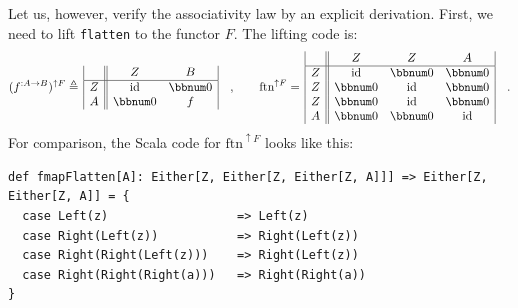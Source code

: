 Let us, however, verify the associativity law by an explicit derivation.
First, we need to lift \lstinline!flatten! to the functor $F$. The
lifting code is:
\[
(f^{:A\rightarrow B})^{\uparrow F}\triangleq\,\begin{array}{|c||cc|}
 & Z & B\\
\hline Z & \text{id} & \bbnum 0\\
A & \bbnum 0 & f
\end{array}\quad,\quad\quad\text{ftn}^{\uparrow F}=\,\begin{array}{|c||ccc|}
 & Z & Z & A\\
\hline Z & \text{id} & \bbnum 0 & \bbnum 0\\
Z & \bbnum 0 & \text{id} & \bbnum 0\\
Z & \bbnum 0 & \text{id} & \bbnum 0\\
A & \bbnum 0 & \bbnum 0 & \text{id}
\end{array}\quad.
\]
For comparison, the Scala code for $\text{ftn}^{\uparrow F}$ looks
like this:
\begin{lstlisting}
def fmapFlatten[A]: Either[Z, Either[Z, Either[Z, A]]] => Either[Z, Either[Z, A]] = {
  case Left(z)                  => Left(z)
  case Right(Left(z))           => Right(Left(z))
  case Right(Right(Left(z)))    => Right(Left(z))
  case Right(Right(Right(a)))   => Right(Right(a))
}
\end{lstlisting}

